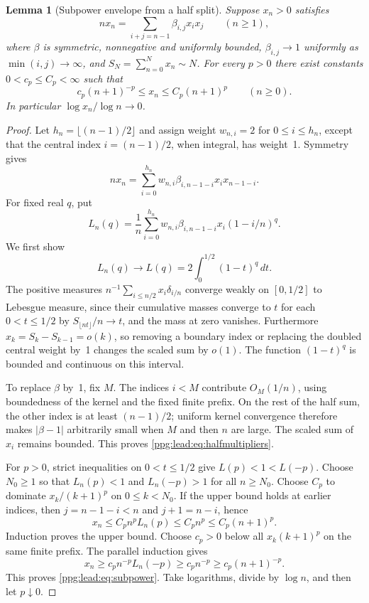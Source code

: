 \documentclass[11pt,letterpaper]{article}
\newtheorem{lemma}[theorem]{Lemma}
\theoremstyle{remark}\newtheorem{remark}[theorem]{Remark}
\numberwithin{equation}{section}
\begin{document}
\begin{lemma}[Subpower envelope from a half split]\label{ppg:lead:lem:subpower}
Suppose $x_n>0$ satisfies
\[
 nx_n=\sum_{i+j=n-1}\beta_{i,j}x_ix_j\qquad(n\ge1),
\]
where $\beta$ is symmetric, nonnegative and uniformly bounded,
$\beta_{i,j}\to1$ uniformly as $\min(i,j)\to\infty$, and
$S_N=\sum_{n=0}^Nx_n\sim N$. For every $p>0$ there exist constants $0<c_p\le C_p<\infty$ such that
\begin{equation}\label{ppg:lead:eq:subpower}
 c_p(n+1)^{-p}\le x_n\le C_p(n+1)^p\qquad(n\ge0).
\end{equation}
In particular $\log x_n/\log n\to0$.
\end{lemma}
\begin{proof}
Let $h_n=\lfloor(n-1)/2\rfloor$ and assign weight $w_{n,i}=2$ for $0\le i\le h_n$, except that the central index $i=(n-1)/2$, when integral, has weight~1. Symmetry gives
\[
 nx_n=\sum_{i=0}^{h_n}w_{n,i}\beta_{i,n-1-i}x_ix_{n-1-i}.
\]
For fixed real $q$, put
\[
 L_n(q)=\frac1n\sum_{i=0}^{h_n}w_{n,i}\beta_{i,n-1-i}x_i(1-i/n)^q.
\]
We first show
\begin{equation}\label{ppg:lead:eq:halfmultipliers}
 L_n(q)\longrightarrow L(q)=2\int_0^{1/2}(1-t)^q\,dt.
\end{equation}
The positive measures $n^{-1}\sum_{i\le n/2}x_i\delta_{i/n}$ converge weakly on $[0,1/2]$ to Lebesgue measure, since their cumulative masses converge to $t$ for each $0<t\le1/2$ by $S_{\lfloor nt\rfloor}/n\to t$, and the mass at zero vanishes. Furthermore
$x_k=S_k-S_{k-1}=o(k)$, so removing a boundary index or replacing the doubled central weight by~1 changes the scaled sum by $o(1)$. The function $(1-t)^q$ is bounded and continuous on this interval.

To replace $\beta$ by~1, fix $M$. The indices $i<M$ contribute $O_M(1/n)$, using boundedness of the kernel and the fixed finite prefix. On the rest of the half sum, the other index is at least $(n-1)/2$; uniform kernel convergence therefore makes $|\beta-1|$ arbitrarily small when $M$ and then $n$ are large. The scaled sum of $x_i$ remains bounded. This proves \eqref{ppg:lead:eq:halfmultipliers}.

For $p>0$, strict inequalities on $0<t\le1/2$ give
$L(p)<1<L(-p)$. Choose $N_0\ge1$ so that $L_n(p)<1$ and $L_n(-p)>1$ for all $n\ge N_0$. Choose $C_p$ to dominate $x_k/(k+1)^p$ on $0\le k<N_0$. If the upper bound holds at earlier indices, then $j=n-1-i<n$ and $j+1=n-i$, hence
\[
 x_n\le C_p n^pL_n(p)\le C_p n^p\le C_p(n+1)^p.
\]
Induction proves the upper bound. Choose $c_p>0$ below all $x_k(k+1)^p$ on the same finite prefix. The parallel induction gives
\[
 x_n\ge c_p n^{-p}L_n(-p)\ge c_p n^{-p}\ge c_p(n+1)^{-p}.
\]
This proves \eqref{ppg:lead:eq:subpower}. Take logarithms, divide by $\log n$, and then let $p\downarrow0$.
\end{proof}
\end{document}
